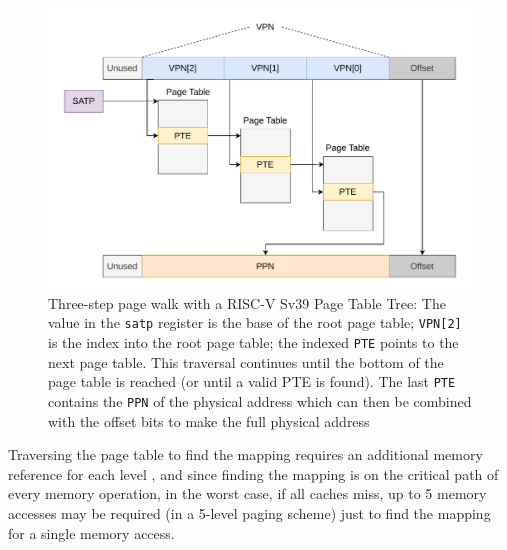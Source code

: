 \begin{figure}[t]
    \centering
    \includegraphics[scale=.8]{figures/VM-Tree.pdf}
    \caption[RISC-V Sv39 3-Level Page Tree]{Three-step page walk with a RISC-V Sv39 Page Table Tree:
        The value in the \texttt{satp} register is the base of the root page table; \texttt{VPN[2]}
        is the index into the root page table; the indexed \texttt{PTE} points to the next page table.
        This traversal continues until the bottom of the page table is reached (or until
        a valid PTE is found). The last \texttt{PTE}
        contains the \texttt{PPN} of the physical address which can then be combined with the offset
        bits to make the full physical address \cite{riscvreader}}
    \label{fig:fund:pagetree}
\end{figure}


Traversing the page table to find the mapping requires an additional memory reference for each
level \cite{jacobVirtualMemoryContemporary1998}, and since finding the mapping is on the critical path of every memory operation,
in the worst case, if all caches miss, up to 5 memory accesses may be required (in a 5-level paging
scheme) just to find the mapping for a single memory access.

